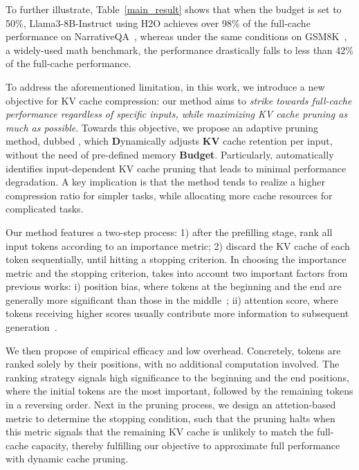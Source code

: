 To further illustrate, Table~\ref{main_result} shows that when the budget is set to 50\%, Llama3-8B-Instruct using H2O achieves over 98\% of the full-cache performance on NarrativeQA~\cite{DBLP:journals/tacl/KociskySBDHMG18}, whereas under the same conditions on GSM8K~\cite{DBLP:journals/corr/abs-2110-14168}, a widely-used math benchmark, the performance drastically falls to less than 42\% of the full-cache performance.

To address the aforementioned limitation, in this work, we introduce a new objective for KV cache compression: our method aims to \textit{strike towards full-cache performance regardless of specific inputs, while maximizing KV cache pruning as much as possible}. Towards this objective, we propose an adaptive pruning method, dubbed \textbf{\method}, which \textbf{D}ynamically adjusts \textbf{KV} cache retention per input, without the need of pre-defined memory \textbf{Budget}.
Particularly, \method automatically identifies input-dependent KV cache pruning that leads to minimal performance degradation. 
A key implication is that the method tends to realize a higher compression ratio for simpler tasks, while allocating more cache resources for complicated tasks.

Our method features a two-step process: 1) after the prefilling stage, rank all input tokens according to an importance metric; 2) discard the KV cache of each token sequentially, until hitting a stopping criterion. In choosing the importance metric and the stopping criterion, \method takes into account two important factors from previous works: i) position bias, where tokens at the beginning and the end are generally more significant than those in the middle~\cite{DBLP:conf/iclr/XiaoTCHL24,DBLP:conf/nips/JiangLZWLAHA0L024}; ii) attention score, where tokens receiving higher scores usually contribute more information to subsequent generation~\cite{DBLP:journals/corr/abs-2402-06196,DBLP:journals/corr/abs-2307-03109,DBLP:conf/nips/Zhang00CZC0TRBW23}. 

We then propose \method of empirical efficacy and low overhead. 
Concretely, tokens are ranked solely by their positions, with no additional computation involved. 
The ranking strategy signals high significance to the beginning and the end positions, where the initial tokens are the most important, followed by the remaining tokens in a reversing order. 
Next in the pruning process, we design an attetion-based metric to determine the stopping condition, such that the pruning halts when this metric signals that the remaining KV cache is unlikely to match the full-cache capacity, thereby fulfilling our objective to approximate full performance with dynamic cache pruning.

